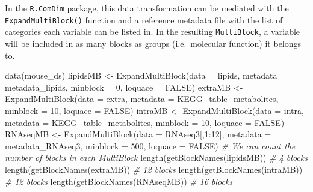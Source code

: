 \documentclass[
]{book}
\newenvironment{Shaded}{\begin{snugshade}}{\end{snugshade}}
\newcommand{\AttributeTok}[1]{\textcolor[rgb]{0.77,0.63,0.00}{#1}}
\newcommand{\CommentTok}[1]{\textcolor[rgb]{0.56,0.35,0.01}{\textit{#1}}}
\newcommand{\ConstantTok}[1]{\textcolor[rgb]{0.00,0.00,0.00}{#1}}
\newcommand{\DecValTok}[1]{\textcolor[rgb]{0.00,0.00,0.81}{#1}}
\newcommand{\FunctionTok}[1]{\textcolor[rgb]{0.00,0.00,0.00}{#1}}
\newcommand{\NormalTok}[1]{#1}
\newcommand{\OtherTok}[1]{\textcolor[rgb]{0.56,0.35,0.01}{#1}}
\newcommand{\SpecialCharTok}[1]{\textcolor[rgb]{0.00,0.00,0.00}{#1}}
\begin{document}
In the \texttt{R.ComDim} package, this data transformation can be mediated with the
\texttt{ExpandMultiBlock()} function and a reference metadata file with the list of
categories each variable can be listed in. In the resulting \texttt{MultiBlock}, a
variable will be included in as many blocks as groups (i.e.~molecular function)
it belongs to.

\begin{Shaded}
\begin{Highlighting}[]
\FunctionTok{data}\NormalTok{(mouse\_ds)}
\NormalTok{lipidsMB }\OtherTok{\textless{}{-}} \FunctionTok{ExpandMultiBlock}\NormalTok{(}\AttributeTok{data =}\NormalTok{ lipids, }\AttributeTok{metadata =}\NormalTok{ metadata\_lipids,}
                             \AttributeTok{minblock =} \DecValTok{0}\NormalTok{, }\AttributeTok{loquace =} \ConstantTok{FALSE}\NormalTok{)}
\NormalTok{extraMB }\OtherTok{\textless{}{-}} \FunctionTok{ExpandMultiBlock}\NormalTok{(}\AttributeTok{data =}\NormalTok{ extra, }\AttributeTok{metadata =}\NormalTok{ KEGG\_table\_metabolites,}
                            \AttributeTok{minblock =} \DecValTok{10}\NormalTok{, }\AttributeTok{loquace =} \ConstantTok{FALSE}\NormalTok{)}
\NormalTok{intraMB }\OtherTok{\textless{}{-}} \FunctionTok{ExpandMultiBlock}\NormalTok{(}\AttributeTok{data =}\NormalTok{ intra, }\AttributeTok{metadata =}\NormalTok{ KEGG\_table\_metabolites,}
                            \AttributeTok{minblock =} \DecValTok{10}\NormalTok{, }\AttributeTok{loquace =} \ConstantTok{FALSE}\NormalTok{)}
\NormalTok{RNAseqMB }\OtherTok{\textless{}{-}} \FunctionTok{ExpandMultiBlock}\NormalTok{(}\AttributeTok{data =}\NormalTok{ RNAseq3[,}\DecValTok{1}\SpecialCharTok{:}\DecValTok{12}\NormalTok{],}
                             \AttributeTok{metadata =}\NormalTok{ metadata\_RNAseq3,}
                             \AttributeTok{minblock =} \DecValTok{500}\NormalTok{, }\AttributeTok{loquace =} \ConstantTok{FALSE}\NormalTok{)}
\CommentTok{\# We can count the number of blocks in each MultiBlock}
\FunctionTok{length}\NormalTok{(}\FunctionTok{getBlockNames}\NormalTok{(lipidsMB)) }\CommentTok{\# 4 blocks}
\FunctionTok{length}\NormalTok{(}\FunctionTok{getBlockNames}\NormalTok{(extraMB))  }\CommentTok{\# 12 blocks}
\FunctionTok{length}\NormalTok{(}\FunctionTok{getBlockNames}\NormalTok{(intraMB))  }\CommentTok{\# 12 blocks}
\FunctionTok{length}\NormalTok{(}\FunctionTok{getBlockNames}\NormalTok{(RNAseqMB)) }\CommentTok{\# 16 blocks}
\end{Highlighting}
\end{Shaded}
\end{document}
